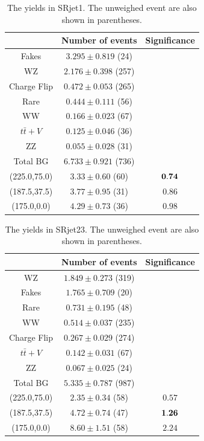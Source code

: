 \begin{table}[htpb]
\centering
\begin{tabular}{|c|c|c|}
\hline
& Number of events & Significance \\
\hline
\hline
Fakes & $3.295\pm0.819$ (24) & \\
\hline
WZ & $2.176\pm0.398$ (257) & \\
\hline
Charge Flip & $0.472\pm0.053$ (265) & \\
\hline
Rare & $0.444\pm0.111$ (56) & \\
\hline
WW & $0.166\pm0.023$ (67) & \\
\hline
$t\bar{t}+V$ & $0.125\pm0.046$ (36) & \\
\hline
ZZ & $0.055\pm0.028$ (31) & \\
\hline
\hline
Total BG & $6.733\pm0.921$ (736) & \\
\hline
\hline
(225.0,75.0) & $3.33\pm0.60$ (60) &$ \bf 0.74$\\
\hline
(187.5,37.5) & $3.77\pm0.95$ (31) &$0.86$\\
\hline
(175.0,0.0) & $4.29\pm0.73$ (36) &$0.98$\\
\hline
\end{tabular}
\caption{The yields in SRjet1. The unweighed event are also shown in parentheses.}
\label{tab:SRjet1_yields}
\end{table}

\begin{table}[htpb]
\centering
\begin{tabular}{|c|c|c|}
\hline
& Number of events & Significance \\
\hline
\hline
WZ & $1.849\pm0.273$ (319) & \\
\hline
Fakes & $1.765\pm0.709$ (20) & \\
\hline
Rare & $0.731\pm0.195$ (48) & \\
\hline
WW & $0.514\pm0.037$ (235) & \\
\hline
Charge Flip & $0.267\pm0.029$ (274) & \\
\hline
$t\bar{t}+V$ & $0.142\pm0.031$ (67) & \\
\hline
ZZ & $0.067\pm0.025$ (24) & \\
\hline
\hline
Total BG & $5.335\pm0.787$ (987) & \\
\hline
\hline
(225.0,75.0) & $2.35\pm0.34$ (58) &$0.57$\\
\hline
(187.5,37.5) & $4.72\pm0.74$ (47) &$\bf 1.26$\\
\hline
(175.0,0.0) & $8.60\pm1.51$ (58) &$2.24$\\
\hline
\end{tabular}
\caption{The yields in SRjet23. The unweighed event are also shown in parentheses.}
\label{tab:SRjet23_yields}
\end{table}

